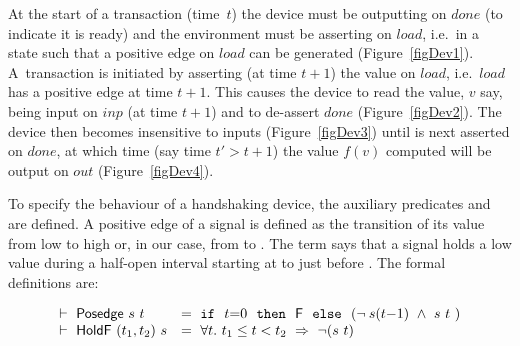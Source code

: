 \documentclass{llncs}
\begin{document}
\vspace*{-6mm}


At the start of a transaction (time~$t$) the device must be outputting
 on $done$ (to indicate it is ready) and the environment must
be asserting  on $load$, i.e.~in a state such that a positive
edge on $load$ can be generated (Figure~\ref{figDev1}).  A~transaction
is initiated by asserting (at time $t{+}1$) the value  on
$load$, i.e.~$load$ has a positive edge at time $t{+}1$. This causes
the device to read the value, $v$ say, being input on $inp$ (at time
$t{+}1$) and to de-assert $done$ (Figure~\ref{figDev2}).  The device
then becomes insensitive to inputs (Figure~\ref{figDev3}) until
 is next asserted on $done$, at which time (say time $t' >
t{+}1$) the value $f(v)$ computed will be output on $out$
(Figure~\ref{figDev4}).

To specify the behaviour of a handshaking device,
the auxiliary predicates  and  are defined.
A positive edge of a signal is defined as the transition of its
value from low to high or, in our case, from  to . 
The term  says that a
signal  holds a low value  during a half-open interval
starting at  to just before . The formal definitions are:

\vspace*{-1mm}

\[
\begin{array}{ll}
\vdash\ \mathsf{Posedge}\ s\ t~ &      = ~ \texttt{if}~~t{=}0~~\texttt{then}~~\mathsf{F}~~\texttt{else}~~(\neg\hspace*{0.8mm} s(t{-}1)\ \wedge\ s\ t~)\\
\vdash\ \mathsf{HoldF}\ (t_1,t_2)\ s & = ~ \forall t.\ t_1 \leq t < t_2\ \Rightarrow\ \neg(s\ t)
\end{array}
\]
\end{document}
